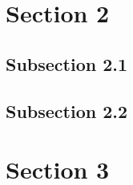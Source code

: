 \section{Section 2}


\subsection{Subsection 2.1}


\subsection{Subsection 2.2}


\section{Section 3}
